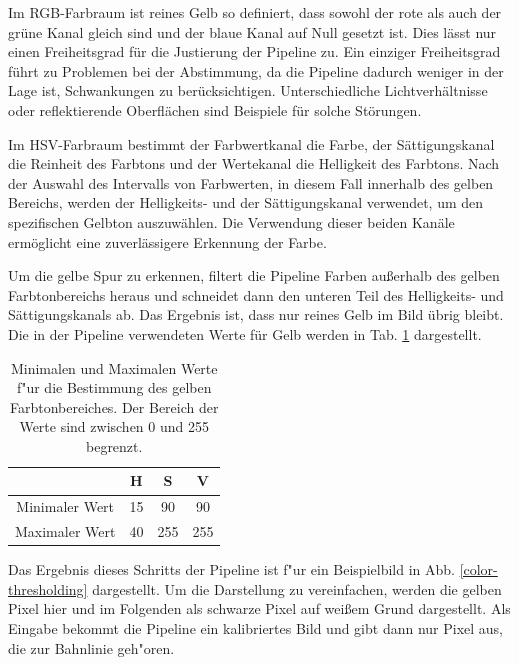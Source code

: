 \documentclass[arbeit=studie,oneside,BCOR=12mm]{ArbeitRST}
\begin{document}
Im RGB-Farbraum ist reines Gelb so definiert, dass sowohl der rote als auch der
grüne Kanal gleich sind und der blaue Kanal auf Null gesetzt ist. Dies lässt
nur einen Freiheitsgrad für die Justierung der Pipeline zu.  Ein einziger
Freiheitsgrad führt zu Problemen bei der Abstimmung, da die Pipeline dadurch
weniger in der Lage ist, Schwankungen zu berücksichtigen. Unterschiedliche
Lichtverhältnisse oder reflektierende Oberflächen sind Beispiele für solche
Störungen.

Im HSV-Farbraum bestimmt der Farbwertkanal die Farbe, der Sättigungskanal die
Reinheit des Farbtons und der Wertekanal die Helligkeit des Farbtons.
\cite{hsv} Nach der Auswahl des Intervalls von Farbwerten, in diesem Fall
innerhalb des gelben Bereichs, werden der Helligkeits- und der Sättigungskanal
verwendet, um den spezifischen Gelbton auszuwählen. Die Verwendung dieser
beiden Kanäle ermöglicht eine zuverlässigere Erkennung der Farbe.

Um die gelbe Spur zu erkennen, filtert die Pipeline Farben außerhalb des gelben
Farbtonbereichs heraus und schneidet dann den unteren Teil des Helligkeits- und
Sättigungskanals ab. Das Ergebnis ist, dass nur reines Gelb im Bild übrig
bleibt. Die in der Pipeline verwendeten Werte für Gelb werden in Tab.
\ref{hsvtable} dargestellt. \\

\begin{table}[h]
\begin{center}
\begin{tabular}{|c|c|c|c|}
\hline
    & H & S & V\\
\hline
\hline
    Minimaler Wert & 15 & 90 & 90 \\
\hline
    Maximaler Wert & 40 & 255 & 255 \\
\hline
\end{tabular}
    \caption{Minimalen und Maximalen Werte f"ur die Bestimmung des gelben Farbtonbereiches. Der Bereich
    der Werte sind zwischen 0 und 255 begrenzt.}
    \label{hsvtable}
\end{center}
\end{table}

Das Ergebnis dieses Schritts der Pipeline ist f"ur ein Beispielbild in Abb.
\ref{color-thresholding} dargestellt. Um die Darstellung zu vereinfachen,
werden die gelben Pixel hier und im Folgenden als schwarze Pixel auf wei{\ss}em
Grund dargestellt. Als Eingabe bekommt die Pipeline ein kalibriertes Bild und 
gibt dann nur Pixel aus, die zur Bahnlinie geh"oren. \\
\end{document}
